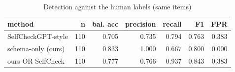 \begin{table}[t]
\centering
\caption{Detection against the human labels (same items)}
\label{tab:selfcheck_vs_human}
\begin{tabular}{lrrrrrr}
\hline
method & n & bal. acc & precision & recall & F1 & FPR \\
\hline
SelfCheckGPT-style & 110 & 0.705 & 0.735 & 0.794 & 0.763 & 0.383 \\
schema-only (ours) & 110 & 0.833 & 1.000 & 0.667 & 0.800 & 0.000 \\
ours OR SelfCheck & 110 & 0.777 & 0.766 & 0.937 & 0.843 & 0.383 \\
\hline
\end{tabular}
\end{table}

